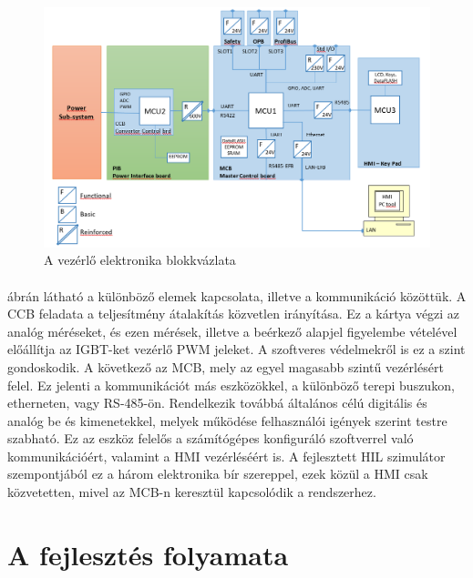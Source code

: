 
\begin{figure}[h]
	\centering
	\includegraphics[width = \textwidth]{figures/architect.png}
	\caption{A vezérlő elektronika blokkvázlata} 
	\label{fig:hw_architect}
\end{figure}

\paragraph{}
 ábrán látható a különböző elemek kapcsolata, illetve a kommunikáció közöttük. A CCB feladata a teljesítmény átalakítás közvetlen irányítása. Ez a kártya végzi az analóg méréseket, és ezen mérések, illetve a beérkező alapjel figyelembe vételével előállítja az IGBT-ket vezérlő PWM jeleket. A szoftveres védelmekről is ez a szint gondoskodik. A következő az MCB, mely az egyel magasabb szintű vezérlésért felel. Ez jelenti a kommunikációt más eszközökkel, a különböző terepi buszukon, etherneten, vagy RS-485-ön. Rendelkezik továbbá általános célú digitális és analóg be és kimenetekkel, melyek működése felhasználói igények szerint testre szabható. Ez az eszköz felelős a számítógépes konfiguráló szoftverrel való kommunikációért, valamint a HMI vezérléséért is. A fejlesztett HIL szimulátor szempontjából ez a három elektronika bír szereppel, ezek közül a HMI csak közvetetten, mivel az MCB-n keresztül kapcsolódik a rendszerhez.

\section{A fejlesztés folyamata}


